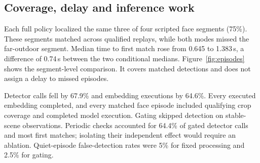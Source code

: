 \documentclass[10pt,letterpaper,twocolumn]{article}
\begin{document}
\subsection{Coverage, delay and inference work}
Each full policy localized the same three of four scripted face segments (75\%). These segments matched across qualified replays, while both modes missed the far-outdoor segment. Median time to first match rose from 0.645 to 1.383\,s, a difference of 0.74\,s between the two conditional medians. Figure~\ref{fig:episodes} shows the segment-level comparison. It covers matched detections and does not assign a delay to missed episodes.

Detector calls fell by 67.9\% and embedding executions by 64.6\%. Every executed embedding completed, and every matched face episode included qualifying crop coverage and completed model execution. Gating skipped detection on stable-scene observations. Periodic checks accounted for 64.4\% of gated detector calls and most first matches; isolating their independent effect would require an ablation. Quiet-episode false-detection rates were 5\% for fixed processing and 2.5\% for gating.
\end{document}
